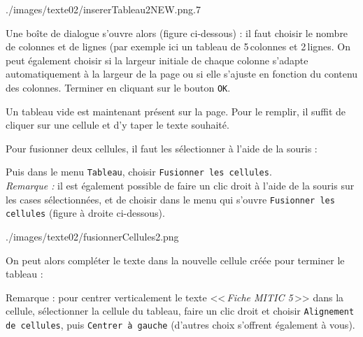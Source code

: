   

%
                {./images/texte02/insererTableau2NEW.png}{.7\textwidth}  



Une boîte de dialogue s'ouvre alors (figure ci-dessous) : il faut choisir le nombre de colonnes et de lignes (par exemple ici un tableau de 5\,colonnes et 2\,lignes. On peut également choisir si la largeur initiale de chaque colonne s'adapte automatiquement à la largeur de la page ou si elle s'ajuste en fonction du contenu des colonnes. Terminer en cliquant sur le bouton \texttt{OK}.  


Un tableau vide est maintenant présent sur la page. Pour le remplir, il suffit de cliquer sur une cellule et d'y taper le texte souhaité.


Pour fusionner deux cellules, il faut les sélectionner à l'aide de la souris :


Puis dans le menu \texttt{Tableau}, choisir \texttt{Fusionner les cellules}.\\ \emph{Remarque :} il est également possible de faire un clic droit à l'aide de la souris sur les cases sélectionnées, et de choisir dans le menu qui s'ouvre \texttt{Fusionner les cellules} (figure à droite ci-dessous).  

%
                {./images/texte02/fusionnerCellules2.png}{\textwidth}  




On peut alors compléter le texte dans la nouvelle cellule créée pour terminer le tableau :


\vspace{24pt}



Remarque : pour centrer verticalement le texte <<\,\emph{Fiche MITIC 5}\,>> dans la cellule, sélectionner la cellule du tableau, faire un clic droit et choisir \texttt{Alignement de cellules}, puis \texttt{Centrer à gauche} (d'autres choix s'offrent également à vous).  

